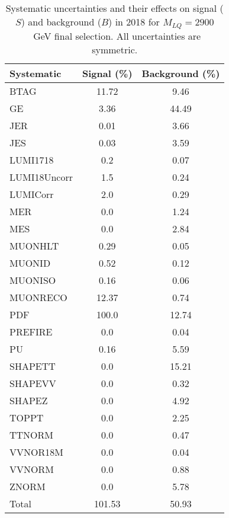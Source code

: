 \begin{table}[htbp]
\begin{center}
\caption{Systematic uncertainties and their effects on signal ($S$) and background ($B$) in 2018 for $M_{LQ}=2900$~GeV final selection. All uncertainties are symmetric.}
\begin{tabular}{lcc}
\hline\hline
Systematic & Signal (\%) & Background (\%) \\ \hline 
BTAG & 11.72 & 9.46\\ 
GE & 3.36 & 44.49\\ 
JER & 0.01 & 3.66\\ 
JES & 0.03 & 3.59\\ 
LUMI1718 & 0.2 & 0.07\\ 
LUMI18Uncorr & 1.5 & 0.24\\ 
LUMICorr & 2.0 & 0.29\\ 
MER & 0.0 & 1.24\\ 
MES & 0.0 & 2.84\\ 
MUONHLT & 0.29 & 0.05\\ 
MUONID & 0.52 & 0.12\\ 
MUONISO & 0.16 & 0.06\\ 
MUONRECO & 12.37 & 0.74\\ 
PDF & 100.0 & 12.74\\ 
PREFIRE & 0.0 & 0.04\\ 
PU & 0.16 & 5.59\\ 
SHAPETT & 0.0 & 15.21\\ 
SHAPEVV & 0.0 & 0.32\\ 
SHAPEZ & 0.0 & 4.92\\ 
TOPPT & 0.0 & 2.25\\ 
TTNORM & 0.0 & 0.47\\ 
VVNOR18M & 0.0 & 0.04\\ 
VVNORM & 0.0 & 0.88\\ 
ZNORM & 0.0 & 5.78\\ 
Total & 101.53 & 50.93\\ \hline \hline
\end{tabular}
\label{tab:SysUncertainties_uujj_2900}
\end{center}
\end{table}

